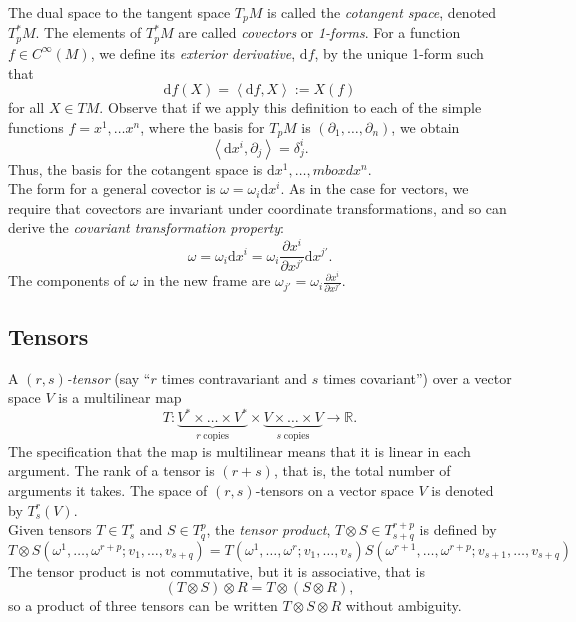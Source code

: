 The dual space to the tangent space $T_p M$ is called the \textit{cotangent
space}, denoted $T^*_p M$. The elements of $T^*_p M$ are called
\textit{covectors} or \textit{1-forms}. For a function $f\in C^{\infty}(M)$, we
define its \textit{exterior derivative}, $\mbox{d}f$, by the unique 1-form such that 
\begin{equation}
\mbox{d}f(X) = \left<\mbox{d}f,X\right> := X(f)
\label{eq:extderiv} 
\end{equation}
for all $X\in TM$. Observe that if we apply this definition to each of the
simple functions \mbox{$f=x^1,\dots x^n$}, where the basis for $T_p M$ is
$(\partial_1,\dots, \partial_n)$, we obtain
\[ \left<\mbox{d}x^i,\partial_j \right>=\delta^i_j. \]
Thus, the basis for the cotangent space is $\mbox{d} x^1,\dots, mbox{d} x^n$.\\

The form for a general covector is $\omega=\omega_i \mbox{d} x^i$. As in the
case for vectors, we require that covectors are invariant under coordinate
transformations, and so can derive the \textit{covariant transformation
property}:
\begin{equation}
\omega = \omega_{i}\mbox{d}x^{i}=\omega_i \frac{\partial x^i}{\partial x^{j'}} \mbox{d}x^{j'}. 
\label{eq:covtp}
\end{equation}
The components of $\omega$ in the new frame are $\omega_{j'}=\omega_i
\frac{\partial x^i}{\partial x^{j'}}.$


\subsection{Tensors}

A $(r,s)$\textit{-tensor} (say ``$r$ times contravariant and $s$ times
covariant'') over a vector space $V$ is a multilinear map 
\[ T:\underbrace{V^*\times \dots \times V^* }_{r \;\mbox{copies}}\times
\underbrace{V \times \dots \times V}_{s\; \mbox{copies}} \rightarrow \mathbb{R}.
\]
The specification that the map is multilinear means that it is linear in each
argument. The rank of a tensor is $(r+s)$, that is, the total number of
arguments it takes. The space of $(r,s)$-tensors on a vector space $V$ is
denoted by $T^r_s(V)$. \\

Given tensors $T\in T^r_s$ and $S\in T^p_q$, the \textit{tensor product},
$T\otimes S \in T^{r+p}_{s+q}$ is defined by
\[
T\otimes S (\omega^1,\dots,\omega^{r+p};v_1,\dots,v_{s+q}) =
 T(\omega^1,\dots,\omega^r;v_1,\dots,v_s)S(\omega^{r+1},\dots,\omega^{r+p};v_{
s+1},\dots,v_{s+q}) \]
The tensor product is not commutative, but it is associative, that is
\[ (T\otimes S)\otimes R =T\otimes(S\otimes R), \]
so a product of three tensors can be written $T\otimes S \otimes R$ without
ambiguity.\\

